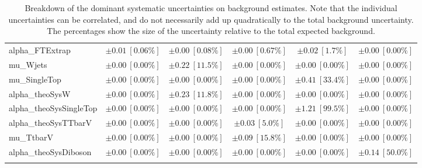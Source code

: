 \begin{sidewaystable}
\begin{center}
\begin{tabular*}{\textwidth}{@{\extracolsep{\fill}}lccccc}
alpha\_FTExtrap         & $\pm 0.01\ [0.06\%] $          & $\pm 0.00\ [0.08\%] $          & $\pm 0.00\ [0.67\%] $          & $\pm 0.02\ [1.7\%] $          & $\pm 0.00\ [0.00\%] $       \\
mu\_Wjets         & $\pm 0.00\ [0.00\%] $          & $\pm 0.22\ [11.5\%] $          & $\pm 0.00\ [0.00\%] $          & $\pm 0.00\ [0.00\%] $          & $\pm 0.00\ [0.00\%] $       \\
mu\_SingleTop         & $\pm 0.00\ [0.00\%] $          & $\pm 0.00\ [0.00\%] $          & $\pm 0.00\ [0.00\%] $          & $\pm 0.41\ [33.4\%] $          & $\pm 0.00\ [0.00\%] $       \\
alpha\_theoSysW         & $\pm 0.00\ [0.00\%] $          & $\pm 0.23\ [11.8\%] $          & $\pm 0.00\ [0.00\%] $          & $\pm 0.00\ [0.00\%] $          & $\pm 0.00\ [0.00\%] $       \\
alpha\_theoSysSingleTop         & $\pm 0.00\ [0.00\%] $          & $\pm 0.00\ [0.00\%] $          & $\pm 0.00\ [0.00\%] $          & $\pm 1.21\ [99.5\%] $          & $\pm 0.00\ [0.00\%] $       \\
alpha\_theoSysTTbarV         & $\pm 0.00\ [0.00\%] $          & $\pm 0.00\ [0.00\%] $          & $\pm 0.03\ [5.0\%] $          & $\pm 0.00\ [0.00\%] $          & $\pm 0.00\ [0.00\%] $       \\
mu\_TtbarV         & $\pm 0.00\ [0.00\%] $          & $\pm 0.00\ [0.00\%] $          & $\pm 0.09\ [15.8\%] $          & $\pm 0.00\ [0.00\%] $          & $\pm 0.00\ [0.00\%] $       \\
alpha\_theoSysDiboson         & $\pm 0.00\ [0.00\%] $          & $\pm 0.00\ [0.00\%] $          & $\pm 0.00\ [0.00\%] $          & $\pm 0.00\ [0.00\%] $          & $\pm 0.14\ [50.0\%] $       \\
\noalign{\smallskip}\hline\noalign{\smallskip}
\end{tabular*}
\end{center}
\caption[Breakdown of uncertainty on background estimates]{
Breakdown of the dominant systematic uncertainties on background estimates.
Note that the individual uncertainties can be correlated, and do not necessarily add up quadratically to 
the total background uncertainty. The percentages show the size of the uncertainty relative to the total expected background.
\label{table.results.bkgestimate.uncertainties.SRC3_bybkg}}
\end{sidewaystable}
%